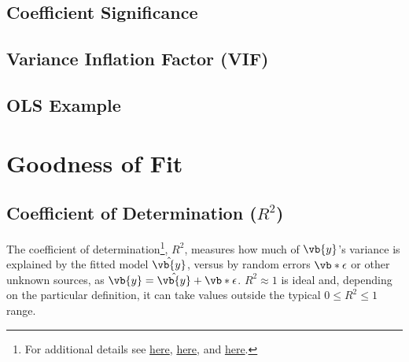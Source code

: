 \subsection{Coefficient Significance}
\label{regression:linear:coeff_significance}

\subsection{Variance Inflation Factor (VIF)}
\label{regression:linear:VIF}

\subsection{OLS Example}
\label{regression:linear:example}

\section{Goodness of Fit}
\label{regression:goodness_of_fit}

\subsection{Coefficient of Determination (\texorpdfstring{$R^{2}$}{R-Squared})}
\label{regression:goodness_of_fit:R2}

The coefficient of determination\footnote{For additional details see
\href{https://economictheoryblog.com/2014/11/05/the-coefficient-of-determination-latex-r2/}{here},
\href{https://economictheoryblog.com/2014/11/05/proof/}{here}, and
\href{http://people.duke.edu/~rnau/rsquared.htm}{here}.}, $R^{2}$,
measures how much of $\vb{y}$'s variance is explained by the fitted model $\hat{\vb{y}}$,
versus by random errors $\vb*{\epsilon}$ or other unknown sources,
as $\vb{y} = \hat{\vb{y}} + \vb*{\epsilon}$.
$R^{2} \approx 1$ is ideal and, depending on the particular definition,
it can take values outside the typical $0 \leq R^{2} \leq 1$ range.

